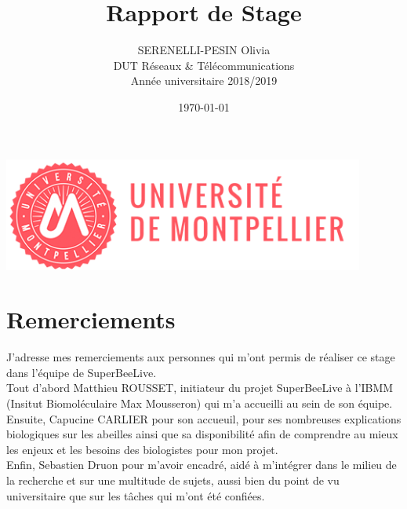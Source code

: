 \documentclass[11pt,french,a4paper]{report}
\title{\LARGE{Rapport de Stage}}
\author{\textsc{SERENELLI-PESIN} Olivia\\DUT Réseaux & Télécommunications\\Année universitaire 2018/2019}
\date{\today}
\begin{document}
\begin{titlepage}
\begin{center}
\includegraphics[scale=0.3]{../images/logo/um_logo.png}
\end{center}

\end{titlepage}
\clearpage
\newpage 

\chapter*{Remerciements}

J’adresse mes remerciements aux personnes qui m’ont permis de réaliser ce stage dans l’équipe de SuperBeeLive. \\
Tout d’abord Matthieu ROUSSET, initiateur du projet SuperBeeLive à l'IBMM (Insitut Biomoléculaire Max Mousseron) 
qui m’a accueilli au sein de son équipe. \\
Ensuite, Capucine CARLIER pour son accueuil, pour ses nombreuses explications biologiques sur les abeilles ainsi que sa disponibilité 
afin de comprendre au mieux les enjeux et les besoins des biologistes pour mon projet. \\
Enfin, Sebastien Druon pour m’avoir encadré, aidé à m’intégrer dans le milieu de la recherche et sur une multitude 
de sujets, aussi bien du point de vu universitaire que sur les tâches qui m’ont été confiées. \\
\end{document}
